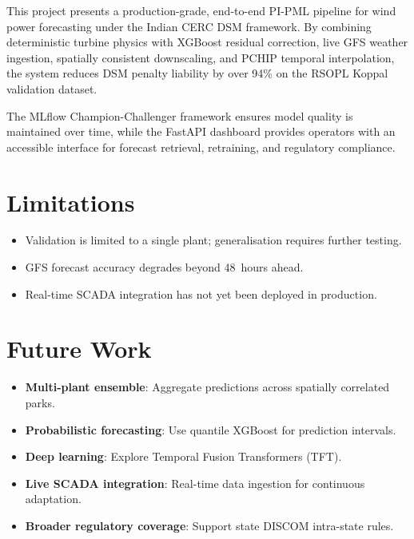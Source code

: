 \documentclass[12pt,a4paper]{report}
\begin{document}
This project presents a production-grade, end-to-end PI-PML pipeline for wind power
forecasting under the Indian CERC DSM framework. By combining deterministic turbine
physics with XGBoost residual correction, live GFS weather ingestion, spatially consistent
downscaling, and PCHIP temporal interpolation, the system reduces DSM penalty liability by
over 94\% on the RSOPL Koppal validation dataset.

The MLflow Champion-Challenger framework ensures model quality is maintained over time,
while the FastAPI dashboard provides operators with an accessible interface for forecast
retrieval, retraining, and regulatory compliance.

\section{Limitations}

\begin{itemize}
  \item Validation is limited to a single plant; generalisation requires further testing.
  \item GFS forecast accuracy degrades beyond 48~hours ahead.
  \item Real-time SCADA integration has not yet been deployed in production.
\end{itemize}

\section{Future Work}

\begin{itemize}
  \item \textbf{Multi-plant ensemble}: Aggregate predictions across spatially correlated parks.
  \item \textbf{Probabilistic forecasting}: Use quantile XGBoost for prediction intervals.
  \item \textbf{Deep learning}: Explore Temporal Fusion Transformers (TFT).
  \item \textbf{Live SCADA integration}: Real-time data ingestion for continuous adaptation.
  \item \textbf{Broader regulatory coverage}: Support state DISCOM intra-state rules.
\end{itemize}
\end{document}
